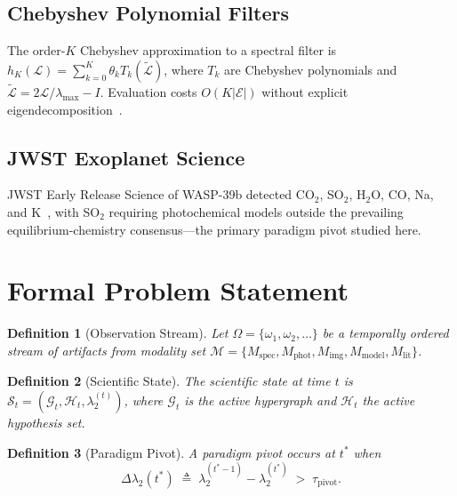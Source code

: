 \documentclass[conference]{IEEEtran}
\newtheorem{definition}{Definition}
\newcommand{\lam}{\lambda_2}
\newcommand{\dlam}{\Delta\lambda_2}
\newcommand{\tpivot}{\tau_{\mathrm{pivot}}}
\newcommand{\Gcal}{\mathcal{G}}
\newcommand{\Ecal}{\mathcal{E}}
\begin{document}
\subsection{Chebyshev Polynomial Filters}
The order-$K$ Chebyshev approximation to a spectral filter is
$h_K(\mathcal{L}) = \sum_{k=0}^{K}\theta_k T_k(\tilde{\mathcal{L}})$,
where $T_k$ are Chebyshev polynomials and
$\tilde{\mathcal{L}} = 2\mathcal{L}/\lambda_\mathrm{max} - I$.
Evaluation costs $O(K|\Ecal|)$ without explicit
eigendecomposition~\cite{shuman2013gsp}.

\subsection{JWST Exoplanet Science}
JWST Early Release Science of WASP-39b detected CO$_2$, SO$_2$, H$_2$O,
CO, Na, and K~\cite{alderson2023,tsai2023so2,jwst_ers_2023}, with SO$_2$
requiring photochemical models outside the prevailing equilibrium-chemistry
consensus---the primary paradigm pivot studied here.

\section{Formal Problem Statement}\label{sec:problem}

\begin{definition}[Observation Stream]
Let $\Omega = \{\omega_1, \omega_2, \ldots\}$ be a temporally ordered
stream of artifacts from modality set
$\mathcal{M} = \{M_\mathrm{spec}, M_\mathrm{phot}, M_\mathrm{img},
M_\mathrm{model}, M_\mathrm{lit}\}$.
\end{definition}

\begin{definition}[Scientific State]
The scientific state at time $t$ is
$\mathcal{S}_t = (\Gcal_t, \mathcal{H}_t, \lam^{(t)})$,
where $\Gcal_t$ is the active hypergraph and $\mathcal{H}_t$ the active
hypothesis set.
\end{definition}

\begin{definition}[Paradigm Pivot]
A paradigm pivot occurs at $t^*$ when
\begin{equation}
  \dlam(t^*) \;\triangleq\; \lam^{(t^*-1)} - \lam^{(t^*)} \;>\; \tpivot.
  \label{eq:pivot}
\end{equation}
\end{definition}
\end{document}
